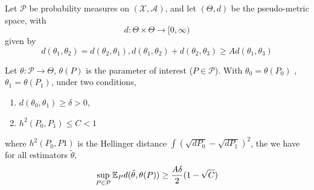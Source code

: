 \begin{lem}
  Let $\mathcal{P}$ be probability measures on $(\mathcal{X}, \mathcal{A})$,
  and let $(\Theta, d)$ be the pseudo-metric space, with
  \begin{equation}
    \label{eq:108}
    d: \Theta \times \Theta \rightarrow [0, \infty)
  \end{equation} given by
  \begin{equation}
    \label{eq:109}
    d(\theta_{1}, \theta_{2}) = d(\theta_{2}, \theta_{1}),
    d(\theta_{1}, \theta_{2}) + d(\theta_{2}, \theta_{3}) \geq A
    d(\theta_{1}, \theta_{3})
  \end{equation}

  Let $\theta: \mathcal{P} \rightarrow \Theta$, $\theta(P)$ is the
  parameter of interest ($P \in \mathcal{P}$).  With $\theta_{0} =
  \theta(P_{0})$ , $\theta_{1} = \theta(P_{1})$, under two conditions,
  \begin{enumerate}
  \item $d(\theta_{0}, \theta_{1} ) \geq \delta > 0$,
  \item $h^{2}(P_{0}, P_{1}) \leq C < 1$
  \end{enumerate}
  where $h^{2}(P_{0}, P1)$ is the Hellinger distance $\int (\sqrt
  {dP_{0}} - \sqrt{dP_{1}})^{2}$,
  the we have for all estimators $\tilde \theta$,
  \begin{equation}
    \label{eq:110}
    \sup_{P \in \mathcal{P}} \E_{P} d(\tilde \theta, \theta(P)) \geq
    \frac{A \delta}{2}(1 - \sqrt{C})
  \end{equation}
\end{lem}

